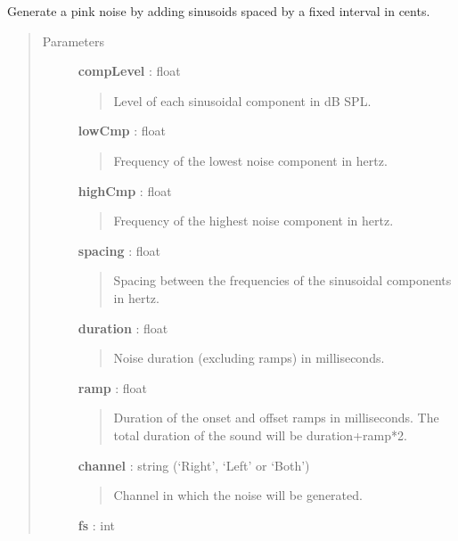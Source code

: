 \documentclass[a4paper,12pt,english]{sphinxmanual}
\begin{document}
\begin{fulllineitems}
\label{sndlib:sndlib.pinkNoiseFromSin}
Generate a pink noise by adding sinusoids spaced by a fixed
interval in cents.
\begin{quote}\begin{description}
\item[{Parameters }] \leavevmode
\textbf{compLevel} : float
\begin{quote}

Level of each sinusoidal component in dB SPL.
\end{quote}

\textbf{lowCmp} : float
\begin{quote}

Frequency of the lowest noise component in hertz.
\end{quote}

\textbf{highCmp} : float
\begin{quote}

Frequency of the highest noise component in hertz.
\end{quote}

\textbf{spacing} : float
\begin{quote}

Spacing between the frequencies of the sinusoidal components
in hertz.
\end{quote}

\textbf{duration} : float
\begin{quote}

Noise duration (excluding ramps) in milliseconds.
\end{quote}

\textbf{ramp} : float
\begin{quote}

Duration of the onset and offset ramps in milliseconds.
The total duration of the sound will be duration+ramp*2.
\end{quote}

\textbf{channel} : string (`Right', `Left' or `Both')
\begin{quote}

Channel in which the noise will be generated.
\end{quote}

\textbf{fs} : int
\begin{quote}


\end{quote}
\end{description}
\end{quote}
\end{fulllineitems}
\end{document}
